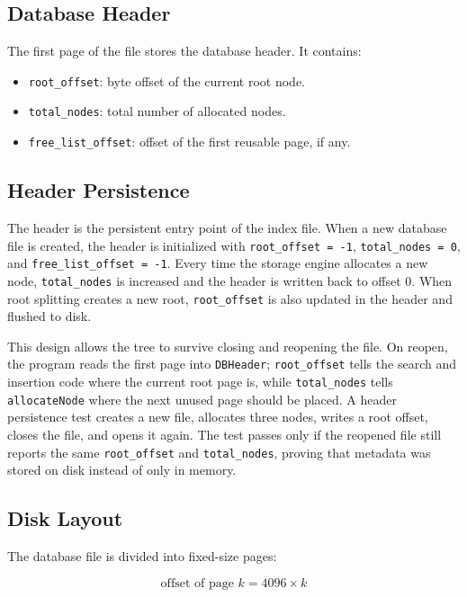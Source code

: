 \documentclass[12pt,a4paper]{article}
\begin{document}
\subsection{Database Header}

The first page of the file stores the database header. It contains:

\begin{itemize}
    \item \texttt{root\_offset}: byte offset of the current root node.
    \item \texttt{total\_nodes}: total number of allocated nodes.
    \item \texttt{free\_list\_offset}: offset of the first reusable page, if any.
\end{itemize}

\subsection{Header Persistence}

The header is the persistent entry point of the index file. When a new database file is created, the header is initialized with \texttt{root\_offset = -1}, \texttt{total\_nodes = 0}, and \texttt{free\_list\_offset = -1}. Every time the storage engine allocates a new node, \texttt{total\_nodes} is increased and the header is written back to offset 0. When root splitting creates a new root, \texttt{root\_offset} is also updated in the header and flushed to disk.

This design allows the tree to survive closing and reopening the file. On reopen, the program reads the first page into \texttt{DBHeader}; \texttt{root\_offset} tells the search and insertion code where the current root page is, while \texttt{total\_nodes} tells \texttt{allocateNode} where the next unused page should be placed. A header persistence test creates a new file, allocates three nodes, writes a root offset, closes the file, and opens it again. The test passes only if the reopened file still reports the same \texttt{root\_offset} and \texttt{total\_nodes}, proving that metadata was stored on disk instead of only in memory.

\subsection{Disk Layout}

The database file is divided into fixed-size pages:

\[
\text{offset of page } k = 4096 \times k
\]
\end{document}
